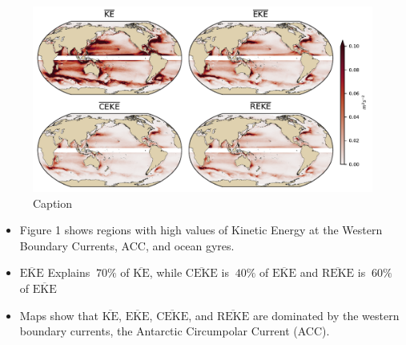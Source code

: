 \documentclass[draft]{agujournal2019}
\newcommand{\MKE}{\overline{\textrm{KE}}}
\newcommand{\MEKE}{\overline{\textrm{EKE}}}
\newcommand{\MCEKE}{\overline{\textrm{CEKE}}}
\newcommand{\MREKE}{\overline{\textrm{REKE}}}
\begin{document}
	\begin{figure}
	    \centering
	    \includegraphics[width=1\textwidth]{figures/mean_ke_maps.pdf}
	    \caption{Caption}
	    \label{fig:my_label}
	\end{figure}
	
	\begin{itemize}
		\item Figure 1 shows regions with high values of Kinetic Energy at the Western Boundary Currents, ACC, and ocean gyres. 
		\item $\MEKE$ Explains $~70\%$ of $\MKE$, while $\MCEKE$ is $~40\%$ of $\MEKE$ and $\MREKE$  is $~60\%$ of $\MEKE$ 
		\item Maps show that $\MKE$, $\MEKE$, $\MCEKE$, and $\MREKE$ are dominated by the western boundary currents, the Antarctic Circumpolar Current (ACC).
	\end{itemize}
	
\end{document}

